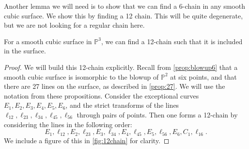 


Another lemma we will need is to show that we can find a 6-chain in any smooth cubic surface. We show this by finding a 12 chain. This will be quite degenerate, but we are not looking for a regular chain here. 

\begin{lemma}\label{lem:12}
    For a smooth cubic surface in $\mathbb{P}^3$, we can find a 12-chain such that it is included in the surface.
\end{lemma}
\begin{proof}
    We will build this 12-chain explicitly. Recall from \cref{prop:blowup6} that a smooth cubic surface is isomorphic to the blowup of $\mathbb{P}^2$ at six points, and that there are 27 lines on the surface, as described in \cref{prop:27}. We will use the notation from these propositions. Consider the exceptional curves $E_1, E_2, E_3, E_4, E_5, E_6$, and the strict transforms of the lines $\ell_{12}, \ell_{23}, \ell_{34}, \ell_{45}, \ell_{56}$ through pairs of points. Then one forms a 12-chain by considering the lines in the following order:
    \[E_1, \ell_{12}, E_2, \ell_{23}, E_3, \ell_{34}, E_4, \ell_{45}, E_5, \ell_{56}, E_6, C_1, \ell_{16}.\]
    We include a figure of this in \cref{fig:12chain} for clarity. 
\end{proof}

